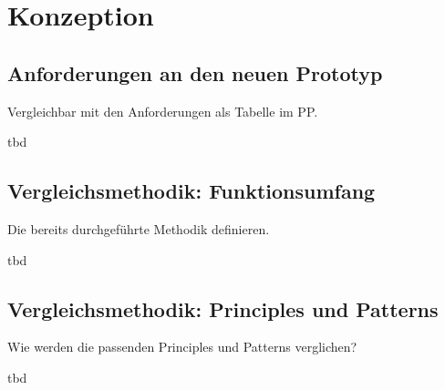 \section{Konzeption}

\subsection{Anforderungen an den neuen Prototyp}
Vergleichbar mit den Anforderungen als Tabelle im PP.

tbd

\subsection{Vergleichsmethodik: Funktionsumfang}
Die bereits durchgeführte Methodik definieren.

tbd

\subsection{Vergleichsmethodik: Principles und Patterns}
Wie werden die passenden Principles und Patterns verglichen?

tbd
